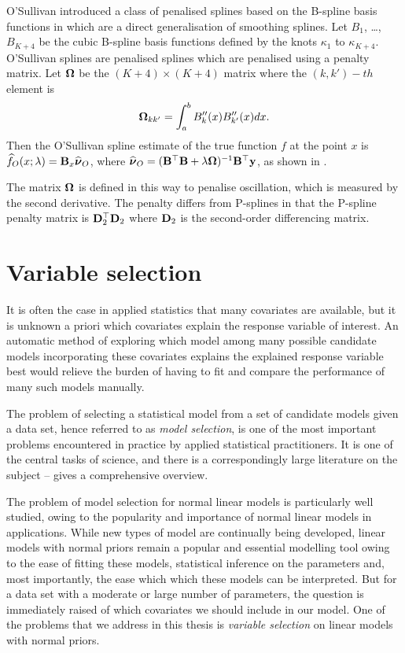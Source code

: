 O'Sullivan introduced a class of penalised splines based on the B-spline basis functions in
\cite{OSullivan1986} which are a direct generalisation of smoothing splines. Let $B_1$, \ldots, $B_{K+4}$ be
the cubic B-spline basis functions defined by the knots $\kappa_1$ to $\kappa_{K+4}$. O'Sullivan splines are
penalised splines which are penalised using a penalty matrix. Let ${\boldsymbol \Omega}$ be the $(K+4) \times (K+4)$ matrix
where the $(k, k')-th$ element is \[   {\boldsymbol \Omega}_{k k'} = \int_a^b B''_k(x) B''_{k'}(x) dx. \] Then the
O'Sullivan spline estimate of the true function $f$ at the point $x$ is $\widehat{f}_O(x; \lambda) = {\bf B}_x
\widehat{{\boldsymbol \nu}}_O$, where $\widehat{{\boldsymbol \nu}}_O = ({\bf B}^\top {\bf B} + \lambda {\boldsymbol\Omega})^{-1} {\bf B}^\top {\bf y}$, as shown in
\cite{ruppert_wand_carroll_2003}.

The matrix ${\boldsymbol \Omega}$ is defined in this way to penalise oscillation, which is measured by the second
derivative. The penalty differs from P-splines in that the P-spline penalty matrix is ${\bf D}_2^\top {\bf D}_2$ where
${\bf D}_2$ is the second-order differencing matrix.

\section{Variable selection}
It is often the case in applied statistics that many covariates are available, but it is unknown a priori
which covariates explain the response variable of interest. An automatic method of exploring which model among
many possible candidate models incorporating these covariates explains the explained response variable best
would relieve the burden of having to fit and compare the performance of many such models manually.

The problem of selecting a statistical model from a set of candidate models given a data set, hence referred
to as \emph{model selection}, is one of the most important problems encountered in practice by applied
statistical practitioners. It is one of the central tasks of science, and there is a correspondingly large
literature on the subject -- \cite{Claeskens:1251912} gives a comprehensive overview.

The problem of model selection for normal linear models is particularly well studied, owing to the popularity
and importance of normal linear models in applications. While new types of model are continually being
developed, linear models with normal priors remain a popular and essential modelling tool owing to the ease of
fitting these models, statistical inference on the parameters and, most importantly, the ease which which
these models can be interpreted. But for a data set with a moderate or large number of parameters, the
question is immediately raised of which covariates we should include in our model. One of the problems that we
address in this thesis is \emph{variable selection} on linear models with normal priors.

